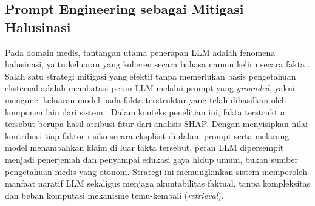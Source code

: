 \subsection{Prompt Engineering sebagai Mitigasi Halusinasi}
Pada domain medis, tantangan utama penerapan LLM adalah fenomena halusinasi, yaitu keluaran yang koheren secara bahasa namun keliru secara fakta \autocite{Ji2023Survey}. Salah satu strategi mitigasi yang efektif tanpa memerlukan basis pengetahuan eksternal adalah membatasi peran LLM melalui prompt yang \emph{grounded}, yakni mengunci keluaran model pada fakta terstruktur yang telah dihasilkan oleh komponen lain dari sistem \autocite{Ji2023Survey}. Dalam konteks penelitian ini, fakta terstruktur tersebut berupa hasil atribusi fitur dari analisis SHAP. Dengan menyisipkan nilai kontribusi tiap faktor risiko secara eksplisit di dalam prompt serta melarang model menambahkan klaim di luar fakta tersebut, peran LLM dipersempit menjadi penerjemah dan penyampai edukasi gaya hidup umum, bukan sumber pengetahuan medis yang otonom. Strategi ini memungkinkan sistem memperoleh manfaat naratif LLM sekaligus menjaga akuntabilitas faktual, tanpa kompleksitas dan beban komputasi mekanisme temu-kembali (\emph{retrieval}).





